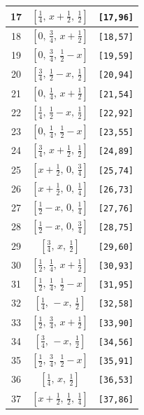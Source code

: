 \documentclass[fleqn,8pt]{jsarticle}
\begin{document}
\begin{longtable}{ccc}
17 & $\left[ \frac{1}{4},\, x + \frac{1}{2},\, \frac{1}{2} \right]$ & {\tt [17,96]} \\ \hline
18 & $\left[ 0,\, \frac{3}{4},\, x + \frac{1}{2} \right]$ & {\tt [18,57]} \\ \hline
19 & $\left[ 0,\, \frac{3}{4},\, \frac{1}{2} - x \right]$ & {\tt [19,59]} \\ \hline
20 & $\left[ \frac{3}{4},\, \frac{1}{2} - x,\, \frac{1}{2} \right]$ & {\tt [20,94]} \\ \hline
21 & $\left[ 0,\, \frac{1}{4},\, x + \frac{1}{2} \right]$ & {\tt [21,54]} \\ \hline
22 & $\left[ \frac{1}{4},\, \frac{1}{2} - x,\, \frac{1}{2} \right]$ & {\tt [22,92]} \\ \hline
23 & $\left[ 0,\, \frac{1}{4},\, \frac{1}{2} - x \right]$ & {\tt [23,55]} \\ \hline
24 & $\left[ \frac{3}{4},\, x + \frac{1}{2},\, \frac{1}{2} \right]$ & {\tt [24,89]} \\ \hline
25 & $\left[ x + \frac{1}{2},\, 0,\, \frac{3}{4} \right]$ & {\tt [25,74]} \\ \hline
26 & $\left[ x + \frac{1}{2},\, 0,\, \frac{1}{4} \right]$ & {\tt [26,73]} \\ \hline
27 & $\left[ \frac{1}{2} - x,\, 0,\, \frac{1}{4} \right]$ & {\tt [27,76]} \\ \hline
28 & $\left[ \frac{1}{2} - x,\, 0,\, \frac{3}{4} \right]$ & {\tt [28,75]} \\ \hline
29 & $\left[ \frac{3}{4},\, x,\, \frac{1}{2} \right]$ & {\tt [29,60]} \\ \hline
30 & $\left[ \frac{1}{2},\, \frac{1}{4},\, x + \frac{1}{2} \right]$ & {\tt [30,93]} \\ \hline
31 & $\left[ \frac{1}{2},\, \frac{1}{4},\, \frac{1}{2} - x \right]$ & {\tt [31,95]} \\ \hline
32 & $\left[ \frac{1}{4},\, - x,\, \frac{1}{2} \right]$ & {\tt [32,58]} \\ \hline
33 & $\left[ \frac{1}{2},\, \frac{3}{4},\, x + \frac{1}{2} \right]$ & {\tt [33,90]} \\ \hline
34 & $\left[ \frac{3}{4},\, - x,\, \frac{1}{2} \right]$ & {\tt [34,56]} \\ \hline
35 & $\left[ \frac{1}{2},\, \frac{3}{4},\, \frac{1}{2} - x \right]$ & {\tt [35,91]} \\ \hline
36 & $\left[ \frac{1}{4},\, x,\, \frac{1}{2} \right]$ & {\tt [36,53]} \\ \hline
37 & $\left[ x + \frac{1}{2},\, \frac{1}{2},\, \frac{1}{4} \right]$ & {\tt [37,86]} \\ \hline

\end{longtable}
\end{document}
